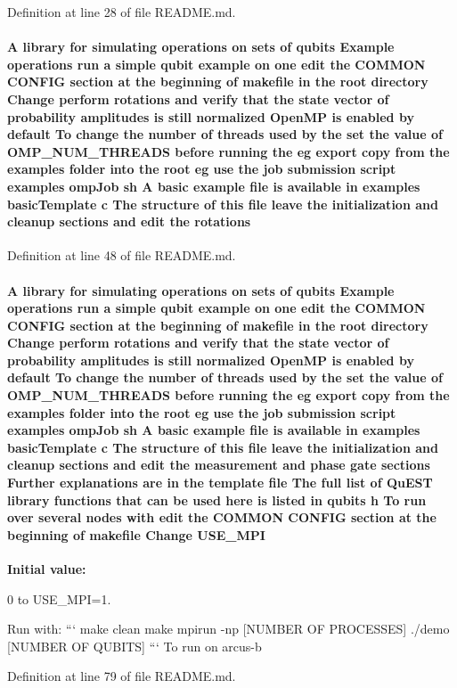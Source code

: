 Definition at line 28 of file README.md.\hypertarget{README_8md_aa51a655a099aacfa420285f13958dee7}{
\paragraph[{rotations}]{\setlength{\rightskip}{0pt plus 5cm}A library for simulating operations on sets of qubits Example operations run a simple qubit example on one edit the COMMON CONFIG section at the beginning of makefile in the root directory Change perform {\bf rotations} and verify that the state vector of probability amplitudes {\bf is} still normalized OpenMP {\bf is} enabled by default To change the number of threads used by the set the value of {\bf OMP\_\-NUM\_\-THREADS} before running the {\bf eg} export copy from the examples {\bf folder} into the root {\bf eg} use the job submission script examples ompJob sh A basic example file {\bf is} available in examples basicTemplate c The structure of this file leave the initialization and cleanup sections and edit the {\bf rotations}}\hfill}
\label{README_8md_aa51a655a099aacfa420285f13958dee7}


Definition at line 48 of file README.md.\hypertarget{README_8md_a4067a4159633c2e4cd24809986ad3bc2}{
\paragraph[{USE\_\-MPI}]{\setlength{\rightskip}{0pt plus 5cm}A library for simulating operations on sets of qubits Example operations run a simple qubit example on one edit the COMMON CONFIG section at the beginning of makefile in the root directory Change perform {\bf rotations} and verify that the state vector of probability amplitudes {\bf is} still normalized OpenMP {\bf is} enabled by default To change the number of threads used by the set the value of {\bf OMP\_\-NUM\_\-THREADS} before running the {\bf eg} export copy from the examples {\bf folder} into the root {\bf eg} use the job submission script examples ompJob sh A basic example file {\bf is} available in examples basicTemplate c The structure of this file leave the initialization and cleanup sections and edit the measurement and phase gate sections Further explanations are in the template file The full list of QuEST library functions that can be used here {\bf is} listed in qubits h To run over several nodes with edit the COMMON CONFIG section at the beginning of makefile Change {\bf USE\_\-MPI}}\hfill}
\label{README_8md_a4067a4159633c2e4cd24809986ad3bc2}
{\bfseries Initial value:}
\begin{DoxyCode}
0 to USE_MPI=1.

Run with:
```
make clean
make
mpirun -np [NUMBER OF PROCESSES] ./demo [NUMBER OF QUBITS]
```
To run on arcus-b
\end{DoxyCode}


Definition at line 79 of file README.md.